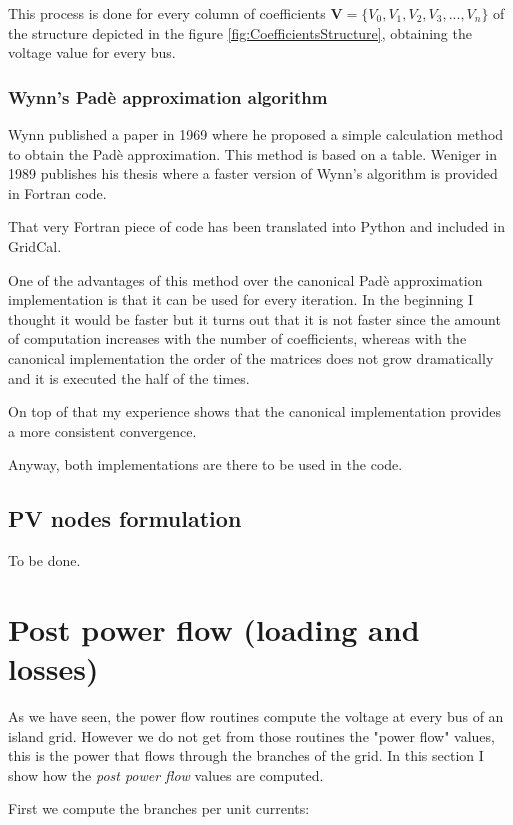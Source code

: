 \documentclass[11pt,fleqn]{book} %
\begin{document}
This process is done for every column of coefficients $\textbf{V}=\{V_0, V_1,V_2,V_3, ...,V_n\}$ of the structure depicted in the figure \ref{fig:CoefficientsStructure}, obtaining the voltage value for every bus.

\subsubsection{Wynn's Padè approximation algorithm}

Wynn published a paper in 1969 where he proposed a simple calculation method to obtain the Padè approximation. This method is based on a table. Weniger in 1989 publishes his thesis where a faster version of Wynn's algorithm is provided in Fortran code. 

That very Fortran piece of code has been translated into Python and included in GridCal.

One of the advantages of this method over the canonical Padè approximation implementation is that it can be used for every iteration. In the beginning I thought it would be faster but it turns out that it is not faster since the amount of computation increases with the number of coefficients, whereas with the canonical implementation the order of the matrices does not grow dramatically and it is executed the half of the times.

On top of that my experience shows that the canonical implementation provides a more consistent convergence.

Anyway, both implementations are there to be used in the code.


\subsection{PV nodes formulation}

To be done.

\newpage
\section{Post power flow (loading and losses)}

As we have seen, the power flow routines compute the voltage at every bus of an island grid. However we do not get from those routines the "power flow" values, this is the power that flows through the branches of the grid. In this section I show how the \textit{post power flow} values are computed. \newline


First we compute the branches per unit currents:
\end{document}
